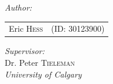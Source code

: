 \begin{titlepage}
\Large \emph{Author:}\\

\begin{table}[h]
        \centering
        \Large
        \begin{tabular}{c c}
            Eric \textsc{Hess} & (ID: 30123900)
        \end{tabular}
    \end{table}

\vspace{1cm}
\large \emph{Supervisor:}\\
Dr. Peter \textsc{Tieleman}\\




\vspace{1.0\baselineskip} %
	\textit{University of Calgary} %

\end{titlepage}